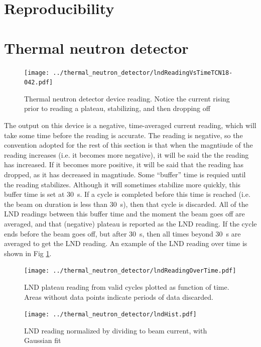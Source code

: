 \documentclass[10pt,letterpaper]{article}
\begin{document}
\section{Reproducibility}


\section{Thermal neutron detector}

\begin{figure}
\centering
\texttt{[image: ../thermal\_neutron\_detector/lndReadingVsTimeTCN18-042.pdf]}
\caption{Thermal neutron detector device reading. Notice the current rising prior to reading a plateau, stabilizing, and then dropping off}
\label{fig:LNDplateau}
\end{figure}

The output on this device is a negative, time-averaged current reading, which will take some time before the reading is accurate. The reading is negative, so the convention adopted for the rest of this section is that when the magntiude of the reading increases (i.e. it becomes more negative), it will be said the the reading has increased. If it becomes more positive, it will be said that the reading has dropped, as it has decreased in magntiude. Some ``buffer'' time is requied until the reading stabilizes. Although it will sometimes stabilize more quickly, this buffer time is set at \SI{30}{\second}. If a cycle is completed before this time is reached (i.e. the beam on duration is less than \SI{30}{\second}), then that cycle is discarded. All of the LND readings between this buffer time and the moment the beam goes off are averaged, and that (negative) plateau is reported as the LND reading. If the cycle ends before the beam goes off, but after \SI{30}{\second}, then all times beyond \SI{30}{\second} are averaged to get the LND reading. An example of the LND reading over time is shown in Fig \ref{fig:LNDplateau}.

\begin{figure}
\centering
\texttt{[image: ../thermal\_neutron\_detector/lndReadingOverTime.pdf]}
\caption{LND plateau reading from valid cycles plotted as function of time. Areas without data points indicate periods of data discarded.}
\label{fig:LNDreadings}
\end{figure}

\begin{figure}
\centering
\texttt{[image: ../thermal\_neutron\_detector/lndHist.pdf]}
\caption{LND reading normalized by dividing to beam current, with Gaussian fit}
\label{fig:LNDhist}
\end{figure}
\end{document}
